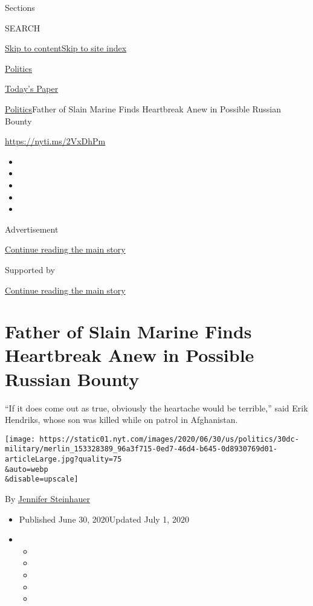 Sections

SEARCH

\protect\hyperlink{site-content}{Skip to
content}\protect\hyperlink{site-index}{Skip to site index}

\href{https://www.nytimes.com/section/politics}{Politics}

\href{https://myaccount.nytimes.com/auth/login?response_type=cookie\&client_id=vi}{}

\href{https://www.nytimes.com/section/todayspaper}{Today's Paper}

\href{/section/politics}{Politics}\textbar{}Father of Slain Marine Finds
Heartbreak Anew in Possible Russian Bounty

\url{https://nyti.ms/2VxDhPm}

\begin{itemize}
\item
\item
\item
\item
\item
\end{itemize}

Advertisement

\protect\hyperlink{after-top}{Continue reading the main story}

Supported by

\protect\hyperlink{after-sponsor}{Continue reading the main story}

\hypertarget{father-of-slain-marine-finds-heartbreak-anew-in-possible-russian-bounty}{%
\section{Father of Slain Marine Finds Heartbreak Anew in Possible
Russian
Bounty}\label{father-of-slain-marine-finds-heartbreak-anew-in-possible-russian-bounty}}

``If it does come out as true, obviously the heartache would be
terrible,'' said Erik Hendriks, whose son was killed while on patrol in
Afghanistan.

\texttt{[image: https://static01.nyt.com/images/2020/06/30/us/politics/30dc-military/merlin\_153328389\_96a3f715-0ed7-46d4-b645-0d8930769d01-articleLarge.jpg?quality=75\\\&auto=webp\\\&disable=upscale]}

By \href{https://www.nytimes.com/by/jennifer-steinhauer}{Jennifer
Steinhauer}

\begin{itemize}
\item
  Published June 30, 2020Updated July 1, 2020
\item
  \begin{itemize}
  \item
  \item
  \item
  \item
  \item
  \end{itemize}
\end{itemize}

